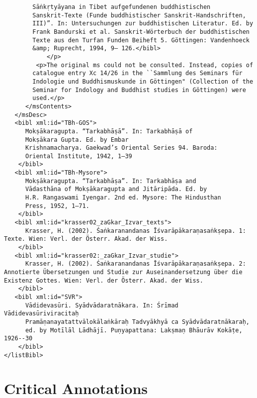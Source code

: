 \documentclass[article,12pt,a4paper]{memoir}%
\begin{document}
\begin{verbatim}
	    Sāṅkṛtyāyana in Tibet aufgefundenen buddhistischen
	    Sanskrit-Texte (Funde buddhistischer Sanskrit-Handschriften,
	    III)”. In: Untersuchungen zur buddhistischen Literatur. Ed. by
	    Frank Bandurski et al. Sanskrit-Wörterbuch der buddhistischen
	    Texte aus den Turfan Funden Beiheft 5. Göttingen: Vandenhoeck
	    &amp; Ruprecht, 1994, 9– 126.</bibl>
	        </p>
         <p>The original ms could not be consulted. Instead, copies of
	    catalogue entry Xc 14/26 in the ``Sammlung des Seminars für
	    Indologie und Buddhismuskunde in Göttingen" (Collection of the
	    Seminar for Indology and Buddhist studies in Göttingen) were
	    used.</p>
      </msContents>
   </msDesc>
   <bibl xml:id="TBh-GOS">
	  Mokṣākaragupta. “Tarkabhāṣā”. In: Tarkabhāṣā of
	  Mokṣākara Gupta. Ed. by Embar
	  Krishnamacharya. Gaekwad’s Oriental Series 94. Baroda:
	  Oriental Institute, 1942, 1–39
	</bibl>
   <bibl xml:id="TBh-Mysore">
	  Mokṣākaragupta. “Tarkabhāṣa”. In: Tarkabhāṣa and
	  Vādasthāna of Mokṣākaragupta and Jitāripāda. Ed. by
	  H.R. Rangaswami Iyengar. 2nd ed. Mysore: The Hindusthan
	  Press, 1952, 1–71.
	</bibl>
   <bibl xml:id="krasser02_zaGkar_Izvar_texts">
	  Krasser, H. (2002). Śaṅkaranandanas Īśvarāpākaraṇasaṅkṣepa. 1: Texte. Wien: Verl. der Österr. Akad. der Wiss.
	</bibl>
   <bibl xml:id="krasser02:_zaGkar_Izvar_studie">
	  Krasser, H. (2002). Śaṅkaranandanas Īśvarāpākaraṇasaṅkṣepa. 2: Annotierte Übersetzungen und Studie zur Auseinandersetzung über die Existenz Gottes. Wien: Verl. der Österr. Akad. der Wiss.
	</bibl>
   <bibl xml:id="SVR">
	  Vādidevasūri. Syādvādaratnākara. In: Śrīmad Vādidevasūriviracitaḥ
	  Pramāṇanayatattvālokālaṅkāraḥ Tadvyākhyā ca Syādvādaratnākaraḥ,
	  ed. by Motīlāl Lādhājī. Puṇyapattana: Lakṣmaṇ Bhāurāv Kokāṭe, 1926--30
	</bibl>
</listBibl>
       \end{verbatim}
     
\chapter*[{Critical Annotations}]{Critical Annotations}                                                                                                              %
     
\end{document}
